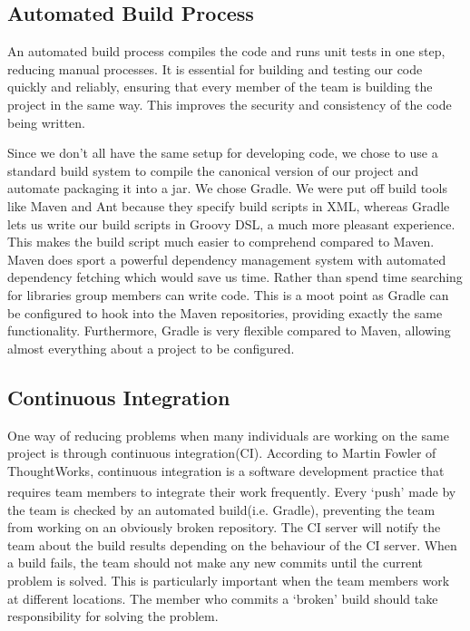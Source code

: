 \documentclass[10pt, a4paper]{article}
\begin{document}
\subsection{Automated Build Process}

An automated build process compiles the code and runs unit tests in one step, reducing manual processes. It is essential for building and testing our code quickly and reliably, ensuring that every member of the team is building the project in the same way. This improves the security and consistency of the code being written. 

Since we don’t all have the same setup for developing code, we chose to use a standard build system to compile the canonical version of our project and automate packaging it into a jar. We chose Gradle. We were put off build tools like Maven and Ant because they specify build scripts in XML, whereas Gradle lets us write our build scripts in Groovy DSL, a much more pleasant experience. This makes the build script much easier to comprehend compared to Maven. Maven does sport a powerful dependency management system with automated dependency fetching which would save us time. Rather than spend time searching for libraries group members can write code. This is a moot point as Gradle can be configured to hook into the Maven repositories, providing exactly the same functionality. Furthermore, Gradle is very flexible compared to Maven, allowing almost everything about a project to be configured. 

\subsection{Continuous Integration}

One way of reducing problems when many individuals are working on the same project is through continuous integration(CI). According to Martin Fowler of ThoughtWorks, continuous integration is a software development practice that requires team members to integrate their work frequently\textsuperscript{\cite{continuous1,continuous2}}. Every ‘push’ made by the team is checked by an automated build(i.e. Gradle), preventing the team from working on an obviously broken repository. The CI server will notify the team about the build results depending on the behaviour of the CI server. When a build fails, the team should not make any new commits until the current problem is solved. This is particularly important when the team members work at different locations. The member who commits a ‘broken’ build should take responsibility for solving the problem.
\end{document}
